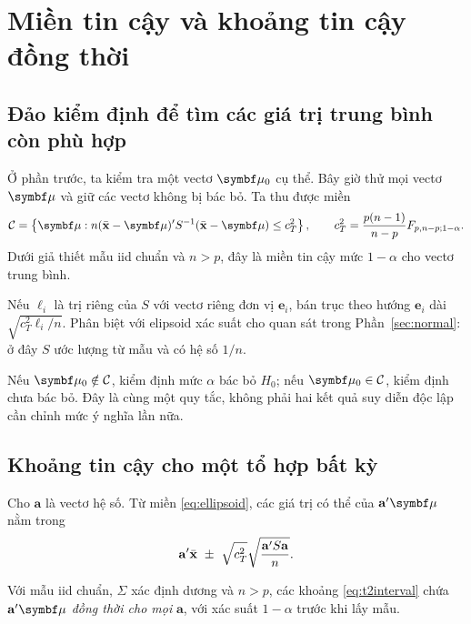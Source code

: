 \clearpage
\section{Miền tin cậy và khoảng tin cậy đồng thời}
\label{sec:confidence}



\subsection{Đảo kiểm định để tìm các giá trị trung bình còn phù hợp}
Ở phần trước, ta kiểm tra một vectơ $\vmu_0$ cụ thể. Bây giờ thử mọi vectơ
$\vmu$ và giữ các vectơ không bị bác bỏ. Ta thu được miền
\begin{equation}
 \mathcal C=\left\{\vmu:
 n(\xbar-\vmu)'S^{-1}(\xbar-\vmu)\le c_T^2\right\},
 \qquad c_T^2=\frac{p(n-1)}{n-p}F_{p,n-p;1-\alpha}.
 \label{eq:ellipsoid}
\end{equation}
Dưới giả thiết mẫu iid chuẩn và $n>p$, đây là miền tin cậy mức
$1-\alpha$ cho vectơ trung bình.


Nếu $\ell_i$ là trị riêng của $S$ với vectơ riêng đơn vị $\mathbf e_i$,
bán trục theo hướng $\mathbf e_i$ dài $\sqrt{c_T^2\ell_i/n}$.
Phân biệt với elipsoid xác suất cho quan sát trong
Phần~\ref{sec:normal}: ở đây $S$ ước lượng từ mẫu và có hệ số $1/n$.

Nếu $\vmu_0\notin\mathcal C$, kiểm định mức $\alpha$ bác bỏ $H_0$;
nếu $\vmu_0\in\mathcal C$, kiểm định chưa bác bỏ. Đây là cùng một quy tắc,
không phải hai kết quả suy diễn độc lập cần chỉnh mức ý nghĩa lần nữa.

\subsection{Khoảng tin cậy cho một tổ hợp bất kỳ}
Cho $\mathbf a$ là vectơ hệ số. Từ miền \eqref{eq:ellipsoid}, các giá trị
có thể của $\mathbf a'\vmu$ nằm trong
\begin{equation}
 \mathbf a'\bar{\mathbf x}\ \pm\
 \sqrt{c_T^2}\sqrt{\frac{\mathbf a'S\mathbf a}{n}}.
 \label{eq:t2interval}
\end{equation}
\begin{result}
Với mẫu iid chuẩn, $\Sigma$ xác định dương và $n>p$, các khoảng
\eqref{eq:t2interval} chứa $\mathbf a'\vmu$ \emph{đồng thời cho mọi}
$\mathbf a$, với xác suất $1-\alpha$ trước khi lấy mẫu.
\end{result}

